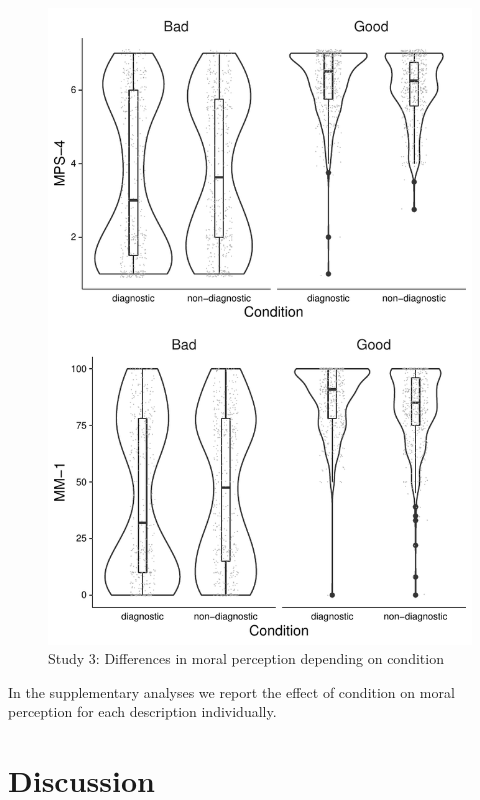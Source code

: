 \documentclass[
  english,
  man,floatsintext]{apa7}
\begin{document}
\begin{figure}
\centering
\includegraphics{moral_dilution_in_chunks_files/figure-latex/S5bothconditionplot-1.pdf}
\caption{\label{fig:S5bothconditionplot}Study 3: Differences in moral perception depending on condition}
\end{figure}

In the supplementary analyses we report the effect of condition on moral perception for each description individually.

\newpage

\hypertarget{discussion}{%
\section{Discussion}\label{discussion}}
\end{document}
